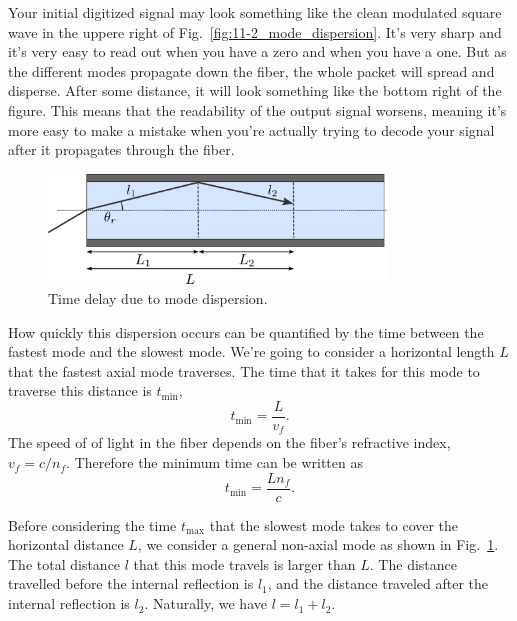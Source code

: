 Your initial digitized signal may look something like the clean modulated square wave in the uppere right of Fig.~\ref{fig:11-2_mode_dispersion}. It's very sharp and it's very easy to read out when you have a zero and when you have a one. But as the different modes propagate down the fiber, the whole packet will spread and disperse. After some distance, it will look something like the bottom right of the figure.
This means that the readability of the output signal worsens, meaning it's more easy to make a mistake when you're actually trying to decode your signal after it propagates through the fiber.

\begin{figure}
    \centering
    \includegraphics[width=0.8\textwidth]{lesson11/11-2_dispersion_delay.pdf}
    \caption[Time delay due to mode dispersion]{Time delay due to mode dispersion.}
    \label{fig:11-2_dispersion_delay}
\end{figure}

How quickly this dispersion occurs can be quantified by the time between the fastest mode and the slowest mode.
We're going to consider a horizontal length $L$ that the fastest axial mode traverses. The time that it takes for this mode to traverse this distance is $t_{\text{min}}$,
\begin{equation}
    t_{\min } =\frac{L}{v_f}.
\end{equation}
The speed of of light in the fiber depends on the fiber's refractive index, $v_f = c / n_f$.
Therefore the minimum time can be written as
\begin{equation}
    t_{\min } =\frac{Ln_f}{c}.
\end{equation}

Before considering the time $t_{\max}$ that the slowest mode takes to cover the horizontal distance $L$, we consider a general non-axial mode as shown in Fig.~\ref{fig:11-2_dispersion_delay}.
The total distance $l$ that this mode travels is larger than $L$.
The distance travelled before the internal reflection is $l_1$, and the distance traveled after the internal reflection is $l_2$.
Naturally, we have $l = l_1 + l_2$.

